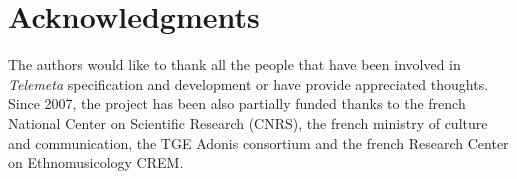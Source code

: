 \documentclass[runningheads,a4paper]{llncs}
\begin{document}
\vspace{-0.3cm}
\section*{Acknowledgments} \vspace{-0.2cm}
The authors would like to thank all the people that have been involved in \emph{Telemeta} specification and development or have provide appreciated thoughts. Since 2007, the project has been also partially funded thanks to the french National Center on Scientific Research (CNRS), the french ministry of culture and communication, the TGE Adonis consortium and the french Research Center on Ethnomusicology CREM.

\vspace{-0.3cm}


\end{document}
